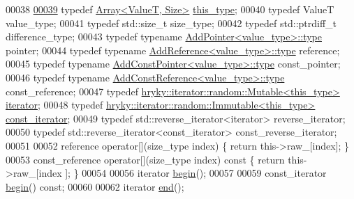 \begin{DoxyCode}
00038 
\hypertarget{array_8h_source_l00039}{}\hyperlink{classhryky_1_1_array_ace26d248a47909ee3875cb7b5a2047e6}{00039}     \textcolor{keyword}{typedef} \hyperlink{classhryky_1_1_array}{Array<ValueT, Size>}                             \hyperlink{classhryky_1_1_array_ace26d248a47909ee3875cb7b5a2047e6}{this_type};
00040     \textcolor{keyword}{typedef} ValueT                                          value\_type;
00041     \textcolor{keyword}{typedef} std::size\_t                                     size\_type;
00042     \textcolor{keyword}{typedef} std::ptrdiff\_t                                  difference\_type;
00043     \textcolor{keyword}{typedef} \textcolor{keyword}{typename} \hyperlink{classhryky_1_1_add_pointer}{AddPointer<value_type>::type}           pointer;
00044     \textcolor{keyword}{typedef} \textcolor{keyword}{typename} \hyperlink{classhryky_1_1_add_reference_a4b90c1381625432ba6152b7388bc4399}{AddReference<value_type>::type}         reference;
00045     \textcolor{keyword}{typedef} \textcolor{keyword}{typename} \hyperlink{classhryky_1_1_add_const_pointer_a62e5c44fefac145f6bd2460e4c8d0ba2}{AddConstPointer<value_type>::type}      const\_pointer;
00046     \textcolor{keyword}{typedef} \textcolor{keyword}{typename} \hyperlink{classhryky_1_1_add_const_reference_aa26e39e87462673d865c90e6a9798b5a}{AddConstReference<value_type>::type}    const\_reference;
00047     \textcolor{keyword}{typedef} \hyperlink{classhryky_1_1iterator_1_1random_1_1_mutable}{hryky::iterator::random::Mutable<this_type>}     \hyperlink{classhryky_1_1iterator_1_1random_1_1_mutable}{iterator};
00048     \textcolor{keyword}{typedef} \hyperlink{classhryky_1_1iterator_1_1random_1_1_immutable}{hryky::iterator::random::Immutable<this_type>}   \hyperlink{classhryky_1_1iterator_1_1random_1_1_immutable}{const_iterator};
00049     \textcolor{keyword}{typedef} std::reverse\_iterator<iterator>                 reverse\_iterator;
00050     \textcolor{keyword}{typedef} std::reverse\_iterator<const\_iterator>           
      const\_reverse\_iterator;
00051 
00052     reference       operator[](size\_type index) \{ \textcolor{keywordflow}{return} this->raw\_[index]; \}
00053     const\_reference operator[](size\_type index)\textcolor{keyword}{ const }\{ \textcolor{keywordflow}{return} this->raw\_[index
      ]; \}
00054 
00056     iterator \hyperlink{classhryky_1_1_array_a12db8f567aa91dbbae25dca68db6e4d3}{begin}();
00057 
00059     const\_iterator \hyperlink{classhryky_1_1_array_a12db8f567aa91dbbae25dca68db6e4d3}{begin}() \textcolor{keyword}{const};
00060 
00062     iterator \hyperlink{classhryky_1_1_array_a56e39a6620eeb368c9b237a82d7507bb}{end}();

\end{DoxyCode}
